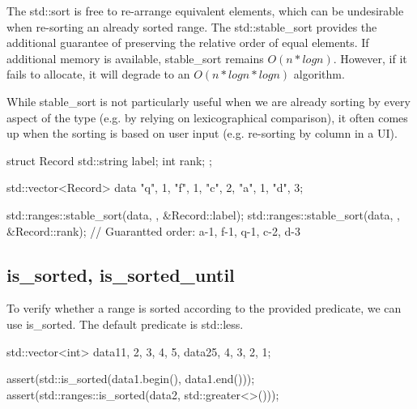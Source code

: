 The std::sort is free to re-arrange equivalent elements, which can be undesirable when re-sorting an already sorted range. The std::stable\_sort provides the additional guarantee of preserving the relative order of equal elements. If additional memory is available, stable\_sort remains $O(n*logn)$. However, if it fails to allocate, it will degrade to an $O(n*logn*logn)$ algorithm.



While stable\_sort is not particularly useful when we are already sorting by every aspect of the type (e.g. by relying on lexicographical comparison), it often comes up when the sorting is based on user input (e.g. re-sorting by column in a UI).

\begin{box-note}
\begin{cppcode}
struct Record {
    std::string label;
    int rank;
};

std::vector<Record> data {{"q", 1}, {"f", 1}, {"c", 2}, {"a", 1}, {"d", 3}};

std::ranges::stable_sort(data, {}, &Record::label);    
std::ranges::stable_sort(data, {}, &Record::rank);
// Guarantted order: a-1, f-1, q-1, c-2, d-3
\end{cppcode}
\end{box-note}

\subsection{is\_sorted, is\_sorted\_until}

To verify whether a range is sorted according to the provided predicate, we can use is\_sorted. The default predicate is std::less.



\begin{box-note}
\begin{cppcode}
std::vector<int> data1{1, 2, 3, 4, 5}, data2{5, 4, 3, 2, 1};

assert(std::is_sorted(data1.begin(), data1.end()));
assert(std::ranges::is_sorted(data2, std::greater<>()));
\end{cppcode}
\end{box-note}

